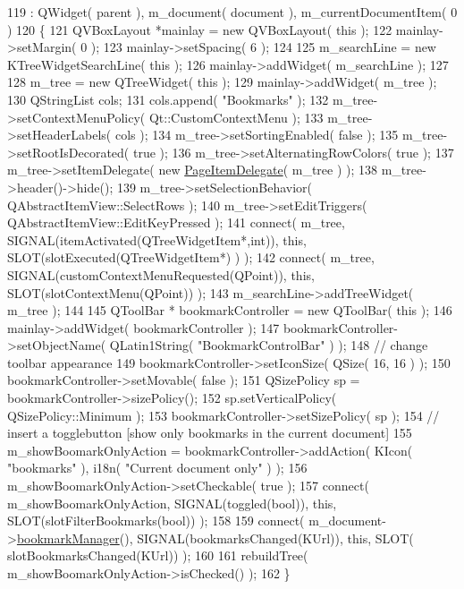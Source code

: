\begin{DoxyCode}
119     : QWidget( parent ), m\_document( document ), m\_currentDocumentItem( 0 )
120 \{
121     QVBoxLayout *mainlay = \textcolor{keyword}{new} QVBoxLayout( \textcolor{keyword}{this} );
122     mainlay->setMargin( 0 );
123     mainlay->setSpacing( 6 );
124 
125     m\_searchLine = \textcolor{keyword}{new} KTreeWidgetSearchLine( \textcolor{keyword}{this} );
126     mainlay->addWidget( m\_searchLine );
127 
128     m\_tree = \textcolor{keyword}{new} QTreeWidget( \textcolor{keyword}{this} );
129     mainlay->addWidget( m\_tree );
130     QStringList cols;
131     cols.append( \textcolor{stringliteral}{"Bookmarks"} );
132     m\_tree->setContextMenuPolicy(  Qt::CustomContextMenu );
133     m\_tree->setHeaderLabels( cols );
134     m\_tree->setSortingEnabled( \textcolor{keyword}{false} );
135     m\_tree->setRootIsDecorated( \textcolor{keyword}{true} );
136     m\_tree->setAlternatingRowColors( \textcolor{keyword}{true} );
137     m\_tree->setItemDelegate( \textcolor{keyword}{new} \hyperlink{classPageItemDelegate}{PageItemDelegate}( m\_tree ) );
138     m\_tree->header()->hide();
139     m\_tree->setSelectionBehavior( QAbstractItemView::SelectRows );
140     m\_tree->setEditTriggers( QAbstractItemView::EditKeyPressed );
141     connect( m\_tree, SIGNAL(itemActivated(QTreeWidgetItem*,\textcolor{keywordtype}{int})), \textcolor{keyword}{this}, SLOT(slotExecuted(QTreeWidgetItem*)
      ) );
142     connect( m\_tree, SIGNAL(customContextMenuRequested(QPoint)), \textcolor{keyword}{this}, SLOT(slotContextMenu(QPoint)) );
143     m\_searchLine->addTreeWidget( m\_tree );
144 
145     QToolBar * bookmarkController = \textcolor{keyword}{new} QToolBar( \textcolor{keyword}{this} );
146     mainlay->addWidget( bookmarkController );
147     bookmarkController->setObjectName( QLatin1String( \textcolor{stringliteral}{"BookmarkControlBar"} ) );
148     \textcolor{comment}{// change toolbar appearance}
149     bookmarkController->setIconSize( QSize( 16, 16 ) );
150     bookmarkController->setMovable( \textcolor{keyword}{false} );
151     QSizePolicy sp = bookmarkController->sizePolicy();
152     sp.setVerticalPolicy( QSizePolicy::Minimum );
153     bookmarkController->setSizePolicy( sp );
154     \textcolor{comment}{// insert a togglebutton [show only bookmarks in the current document]}
155     m\_showBoomarkOnlyAction = bookmarkController->addAction( KIcon( \textcolor{stringliteral}{"bookmarks"} ), i18n( \textcolor{stringliteral}{"Current document
       only"} ) );
156     m\_showBoomarkOnlyAction->setCheckable( \textcolor{keyword}{true} );
157     connect( m\_showBoomarkOnlyAction, SIGNAL(toggled(\textcolor{keywordtype}{bool})), \textcolor{keyword}{this}, SLOT(slotFilterBookmarks(\textcolor{keywordtype}{bool})) );
158 
159     connect( m\_document->\hyperlink{classOkular_1_1Document_a2a2a1f0f5384563c8b24c2ba48809839}{bookmarkManager}(), SIGNAL(bookmarksChanged(KUrl)), \textcolor{keyword}{this}, SLOT(
      slotBookmarksChanged(KUrl)) );
160 
161     rebuildTree( m\_showBoomarkOnlyAction->isChecked() );
162 \}
\end{DoxyCode}
